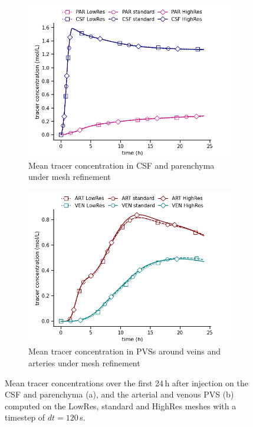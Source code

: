 \documentclass[fleqn,10pt]{wlscirep}
\begin{document}
\begin{figure}
    \centering
    \begin{subfigure}[b]{0.45\textwidth}
        \centering
        \includegraphics[width = 1 \linewidth]{figures/mesh_refinement_par_csf_mean.png}
        \caption{Mean tracer concentration in CSF and parenchyma under mesh refinement}
    \end{subfigure}
    \begin{subfigure}[b]{0.45\textwidth}
        \centering
     \includegraphics[width= 1 \linewidth]{figures/mesh_refinement_art_ven_mean.png}
         \caption{Mean tracer concentration in PVSs around veins and arteries  under mesh refinement}
    \end{subfigure}
    \caption{Mean tracer concentrations over the first 24\,h after injection on the CSF and parenchyma (a), and the arterial and venous PVS (b) computed on the LowRes, standard and HighRes meshes with a timestep of $dt=120$\,s.}
    \label{fig:mesh_convergence_concentrations}
\end{figure}
\end{document}
